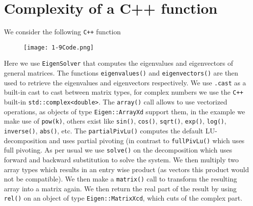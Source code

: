 \documentclass{article}
\begin{document}
\section*{Complexity of a C++ function}
We consider the following \verb|C++| function
\begin{figure}[!hbt]
    \centering
\texttt{[image: 1-9Code.png]}
\end{figure}

\noindent Here we use \verb|EigenSolver| that computes the eigenvalues and eigenvectors of general matrices. The functions \verb|eigenvalues()| and \verb|eigenvectors()| are then used to retrieve the eigenvalues and eigenvectors respectively. We use \verb|.cast| as a built-in cast to cast between matrix types, for complex numbers we use the \verb|C++| built-in \verb|std::complex<double>|. The \verb|array()| call allows to use vectorized operations, as objects of type \verb|Eigen::ArrayXd| support them, in the example we make use of \verb|pow(k)|, others exist like \verb|sin()|, \verb|cos()|, \verb|sqrt()|, \verb|exp()|, \verb|log()|, \verb|inverse()|,  \verb|abs()|, etc. The \verb|partialPivLu()| computes the default LU-decomposition and uses partial pivoting (in contrast to \verb|fullPivLu()| which uses full pivoting. As per usual we use \verb|solve()| on the decomposition which uses forward and backward substitution to solve the system. We then multiply two array types which results in an entry wise product (as vectors this product would not be compatible). We then make a \verb|matrix()| call to transform the resulting array into a matrix again. We then return the real part of the result by using \verb|rel()| on an object of type \verb|Eigen::MatrixXcd|, which cuts of the complex part.
\end{document}
